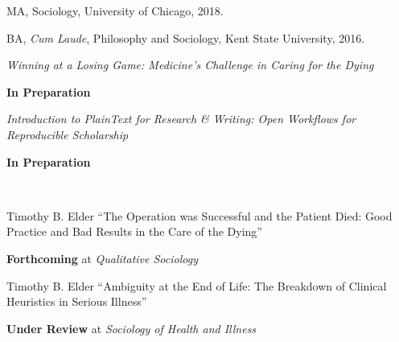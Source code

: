 \documentclass[11pt,article,oneside]{memoir}
\begin{document}
\ind MA, Sociology, University of Chicago, 2018.

\ind BA, \emph{Cum Laude}, Philosophy and Sociology, Kent State University, 2016. \vspace{0.1in}

\bigskip


\ind \textit{Winning at a Losing Game: Medicine's Challenge in Caring for the Dying}\\
\strut\hspace{0.4in} \footnotesize \textbf{In Preparation}\normalsize \\\vspace{0.1in}

\ind \textit{Introduction to PlainText for Research \& Writing: Open Workflows for Reproducible Scholarship}\\
\strut\hspace{0.4in} \footnotesize \textbf{In Preparation}\\\vspace{0.1in}

\medskip


\normalsize

\ind {} \\\vspace{0.1in}

\ind Timothy B. Elder ``The Operation was Successful and the Patient Died: Good Practice and Bad Results in the Care of the Dying'' \\
	\strut\hspace{0.4in} \footnotesize \textbf{Forthcoming} at \textit{Qualitative Sociology} \normalsize \\\vspace{0.1in}

\ind Timothy B. Elder ``Ambiguity at the End of Life: The Breakdown of Clinical Heuristics in Serious Illness'' \\
	\strut\hspace{0.4in} \footnotesize \textbf{Under Review} at \textit{Sociology of Health and Illness} \normalsize \\\vspace{0.1in}

\medskip

\end{document}
